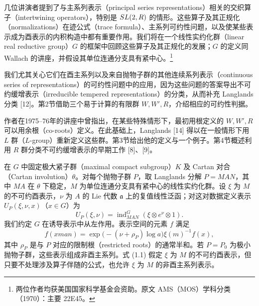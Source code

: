 几位讲演者提到了与主系列表示（principal series representations）相关的交织算子（intertwining operators），特别是 $SL(2,R)$ 的情形。这些算子及其正规化（normalizations）在迹公式（trace formula）、主系列可约性问题，以及使某些表示成为酉表示的内积构造中都有重要作用。我们将在一个线性实约化群（linear real reductive group）$G$ 的框架中回顾这些算子及其正规化的发展；$G$ 的定义同 Wallach 的讲座，并假设其单位连通分支具有紧中心。\footnote{两位作者均获美国国家科学基金会资助。原文 AMS（MOS）学科分类（1970）：主要 22E45。}

我们尤其关心它们在酉主系列以及来自抛物子群的其他连续系列表示（continuous series of representations）的可约性问题中的应用，因为这些问题的答案导出不可约缓增表示（irreducible tempered representations）的分类，从而补充 Langlands 分类 [12]。第2节借助三个易于计算的有限群 $W,W',R$，介绍相应的可约性判据。

作者在1975--76年的讲座中曾指出，在某些特殊情形下，最初用根定义的 $W,W',R$ 可以用余根（co-roots）定义。在此基础上，Langlands [14] 得以在一般情形下用 $L$ 群（$L$-group）重新定义这些群。第3节给出他的定义与一个例子。第4节概述利用 $R$ 群分类不可约缓增表示的早期工作 [8]、[9]。

在 $G$ 中固定极大紧子群（maximal compact subgroup）$K$ 及 Cartan 对合（Cartan involution）$\theta$。对每个抛物子群 $P$，取 Langlands 分解 $P=MAN$，其中 $MA$ 在 $\theta$ 下稳定，$M$ 为单位连通分支具有紧中心的线性实约化群。设 $\xi$ 为 $M$ 的不可约酉表示，$\nu$ 为 $A$ 的 Lie 代数 $\mathfrak a$ 上的复值线性泛函；对这对数据定义表示 $U_P(\xi,\nu,x)$（$x\in G$）为
\begin{equation}
 U_P(\xi,\nu)=\operatorname{ind}_{MAN}^G(\xi\otimes e^\nu\otimes1).
 \tag{1.1}
\end{equation}
我们约定 $G$ 在诱导表示中从左作用。表示空间的元素 $f$ 满足
\[
 f(xman)=\exp\bigl(- (\nu+\rho_P)\log a\bigr)\xi(m)^{-1}f(x),
\]
其中 $\rho_P$ 是与 $P$ 对应的限制根（restricted roots）的通常半和。若 $P=P_0$ 为极小抛物子群，这些表示组成非酉主系列。式 (1.1) 假定 $\xi$ 为 $M$ 的不可约酉表示，但只要不处理涉及算子伴随的公式，也允许 $\xi$ 为 $M$ 的非酉主系列表示。

